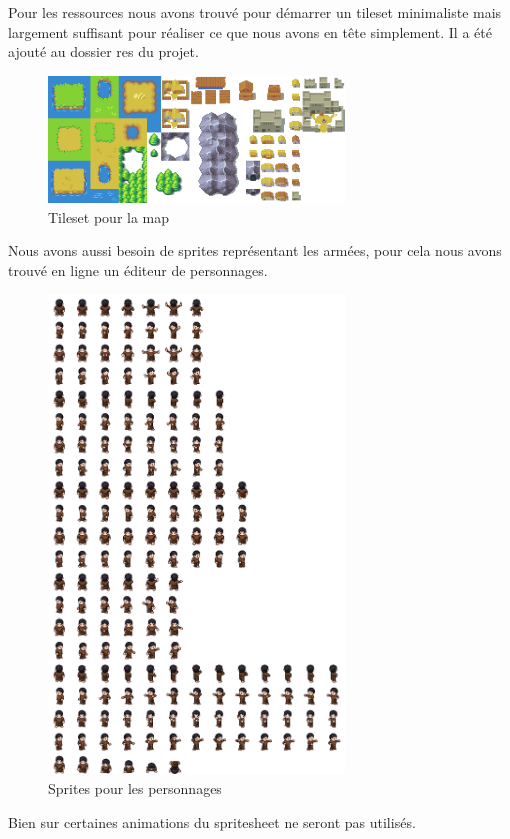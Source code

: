 \documentclass[a4paper,12pt]{article}
\begin{document}
\vspace{1\baselineskip}


Pour les ressources nous avons trouvé pour démarrer un tileset minimaliste mais largement suffisant pour réaliser ce que nous avons en tête simplement. Il a été ajouté au dossier res du projet.
\\

\begin{figure}[H]
\begin{center}
  \includegraphics[width=0.7\textwidth]{images/tileset.png}
  \caption{Tileset pour la map}
 \end{center}

\end{figure}

Nous avons aussi besoin de sprites représentant les armées, pour cela nous avons trouvé en ligne un éditeur de personnages.

\begin{figure}[H]
\begin{center}
  \includegraphics[width=0.7\textwidth]{images/sprite.png}
  \caption{Sprites pour les personnages}
 \end{center}

\end{figure}

Bien sur certaines animations du spritesheet ne seront pas utilisés.



%
\end{document}
